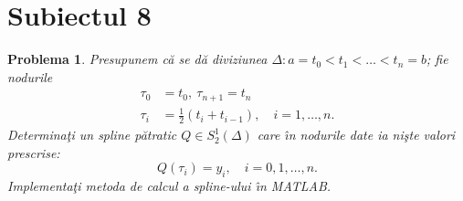 \documentclass{article}%
\newtheorem{problem}[theorem]{Problema}
\begin{document}
\section*{Subiectul 8}

\begin{problem}
\label{Subbotinspline}Presupunem c\u{a} se d\u{a} diviziunea $\Delta
:a=t_{0}<t_{1}<\dots<t_{n}=b$; fie nodurile
\begin{align*}
\tau_{0}  &  =t_{0},~\tau_{n+1}=t_{n}\\
\tau_{i}  &  =\frac{1}{2}\left(  t_{i}+t_{i-1}\right)  ,\quad i=1,\dots,n.
\end{align*}
Determina\c{t}i un spline p\u{a}tratic $Q\in S_{2}^{1}(\Delta)$ care \^{\i}n
nodurile date ia ni\c{s}te valori prescrise:%
\[
Q(\tau_{i})=y_{i},\quad i=0,1,\dots,n.
\]
Implementa\c{t}i metoda de calcul a spline-ului \^{\i}n MATLAB.
\end{problem}
\end{document}
